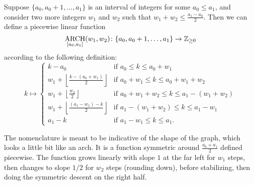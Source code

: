 \begin{definition}
  Suppose $\{a_0, a_0 + 1, \dots, a_1\}$ is an interval of integers for some $a_0 \le a_1$,
  and consider two more integers $w_1$ and $w_2$ such that $w_1 + w_2 \le \frac{a_1-a_0}{2}$.
  Then we can define a piecewise linear function
  \[ \operatorname*{ARCH}_{[a_0, a_1]}(w_1, w_2) \colon \{a_0, a_0+1, \dots, a_1\} \to \mathbb Z_{\ge 0} \]
  according to the following definition:
  \[
    k \mapsto
    \begin{cases}
      k - a_0 & \text{if }a_0 \le k \le a_0 + w_1 \\
      w_1 + \left\lfloor \frac{k-(a_0+w_1)}{2} \right\rfloor & \text{if } a_0 + w_1 \le k \le a_0 + w_1 + w_2 \\
      w_1 + \left\lfloor \frac{w_2}{2} \right\rfloor & \text{if } a_0 + w_1 + w_2 \le k \le a_1 - (w_1 + w_2)\\
      w_1 + \left\lfloor \frac{(a_1-w_1) - k}{2} \right\rfloor & \text{if } a_1 - (w_1 + w_2) \le k \le a_1 - w_1 \\
      a_1 - k & \text{if }a_1 - w_1 \le k \le a_1.
    \end{cases}
  \]
\end{definition}
The nomenclature is meant to be indicative of the shape of the graph,
which looks a little bit like an arch.
It is a function symmetric around $\frac{a_0+a_1}{2}$ defined piecewise.
The function grows linearly with slope $1$ at the far left for $w_1$ steps,
then changes to slope $1/2$ for $w_2$ steps (rounding down),
before stabilizing, then doing the symmetric descent on the right half.
